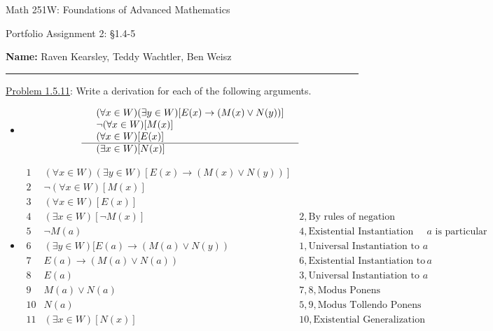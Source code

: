 \documentclass{article}
\theoremstyle{definition}
\begin{document}
	\begin{center}
		\Large{Math 251W: Foundations of Advanced Mathematics}

		\normalsize{Portfolio Assignment 2: \S 1.4-5}

		\vspace{0.2cm}

		\hfill {\bf Name:} Raven Kearsley, Teddy Wachtler, Ben Weisz

		\vspace{0.25cm}
		\hrule
	\end{center}

	\vspace{0.3cm}


	\noindent \underline{Problem 1.5.11}: Write a derivation for each of the following arguments.
	\begin{itemize}

		\item[(4)] $$\begin{array}{llr}
						 & (\forall x \in W)(\exists y \in W)[E(x)\rightarrow (M(x)\vee N(y))] & \\
						 & \neg(\forall x \in W)[M(x)]& \\
						 & (\forall x \in W)[E(x)] & \\
						 \hline
						 & (\exists x \in W)[N(x)] &
		\end{array}$$

	\end{itemize}

	\vspace{0.25cm}
	\begin{itemize}

		\item[(4)] $$\begin{array}{llr}
						 1 & (\forall x \in W)(\exists y \in W)[E(x)\rightarrow (M(x)\vee N(y))] \\
						 2 & \neg(\forall x \in W)[M(x)] \\
						 3 & (\forall x \in W)[E(x)] \\
						 \hline
						 4 & (\exists x \in W)[\neg M(x)]& 2, \mbox{By rules of negation} \\
						 5 & \neg M(a) & 4, \mbox{Existential Instantiation where $a$ is particular} \\
						 6 & (\exists y \in W)[E(a)\rightarrow (M(a)\vee N(y)) & 1, \mbox{Universal Instantiation to $a$} \\
						 7 & E(a)\rightarrow (M(a) \vee N(a)) & 6, \mbox{Existential Instantiation to $a$} \\
						 8 & E(a) & 3, \mbox{Universal Instantiation to $a$} \\
						 9 & M(a) \vee N(a) & 7, 8, \mbox{Modus Ponens} \\
						 10 & N(a) & 5, 9,\mbox{Modus Tollendo Ponens} \\
						 11 & (\exists x \in W)[N(x)] & 10, \mbox{Existential Generalization}
		\end{array}$$

	\end{itemize}
\end{document}
